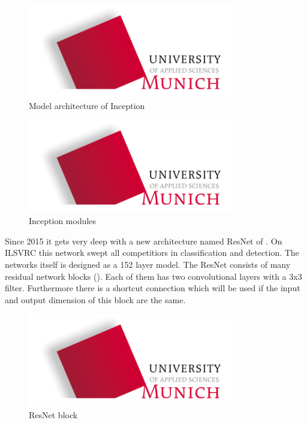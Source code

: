 \begin{figure}[htbp]
\includegraphics[width=0.8\textwidth]{includes/MUASlogo}
\caption[Model architecture of Inception]{Model architecture of Inception \citep{Szegedy2014}}
\label{fig:FH-Logo4}
\end{figure}
\begin{figure}[htbp]
\includegraphics[width=0.8\textwidth]{includes/MUASlogo}
\caption[Inception modules]{Inception modules \citep{Szegedy2014}}
\label{fig:FH-Logo5}
\end{figure}

Since 2015 it gets very deep with a new architecture named ResNet of \citet{HE2015}. On ILSVRC this network swept all competitiors in classification and detection. The networks itself is designed as a 152 layer model. The ResNet consists of many residual network blocks (). Each of them has two convolutional layers with a 3x3 filter. Furthermore there is a shortcut connection which will be used if the input and output dimension of this block are the same.

\begin{figure}[htbp]
\includegraphics[width=0.8\textwidth]{includes/MUASlogo}
\caption[ResNet block]{ResNet block \citep{HE2015}}
\label{fig:FH-Logo6}
\end{figure}

